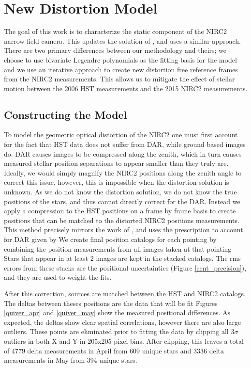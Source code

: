 
\section{New Distortion Model}
The goal of this work is to characterize the static component of the NIRC2 narrow field camera.  This updates the solution of \cite{Yelda_2010}, and uses a similar approach.  There are two primary differences between our methodology and theirs; we choose to use bivariate Legendre polynomials as the fitting basis for the model and we use an iterative approach to create new distortion free reference frames from the NIRC2 measurements.  This allows us to mitigate the effect of stellar motion between the 2006 HST measurements and the 2015 NIRC2 measurements.
\subsection{Constructing the Model}
To model the geometric optical distortion of the NIRC2 one must first account for the fact that HST data does not suffer from DAR, while ground based images do.  DAR causes images to be compressed along the zenith, which in turn causes measured stellar position separations to appear smaller than they truly are.  Ideally, we would simply magnify the NIRC2 positions along the zenith angle to correct this issue, however,  this is impossible when the distortion solution is unknown.  As we do not know the distortion solution, we do not know the true positions of the stars, and thus cannot directly correct for the DAR.  Instead we apply a compression to the HST positions on a frame by frame basis to create positions that can be matched to the distorted NIRC2 positions measurements. This method precisely mirrors the work of \cite{Yelda_2010}, and uses the prescription to account for DAR given by \cite{Gubler}
We create final position catalogs for each pointing by combining the position measurements from all images taken at that pointing  Stars that appear in at least 2 images are kept in the stacked catalogs.  The rms errors from these stacks are the positional uncertainties (Figure \ref{cent_precision}), and they are used to weight the fits.

After this correction, sources are matched between the HST and NIRC2 catalogs.  The deltas between theses positions are the data that will be fit   Figures \ref{quiver_apr} and \ref{quiver_may} show the measured positional differences.  As expected, the deltas show clear spatial correlations, however there are also large outliers.  These points are eliminated prior to fitting the data by clipping all 3$\sigma$ outliers in both X and Y in 205x205 pixel bins.  After clipping, this leaves a total of 4779 delta measurements in April from 609 unique stars and 3336 delta measurements in May from 394 unique stars. 

